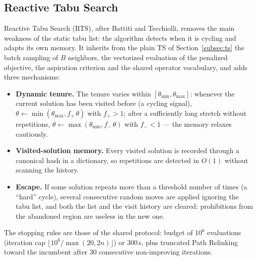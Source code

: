 \subsection{Reactive Tabu Search}
\label{subsec:rts}

Reactive Tabu Search (RTS), after Battiti and Tecchiolli, removes the main
weakness of the static tabu list: the algorithm detects when it is cycling
and adapts its own memory. It inherits from the plain TS of
Section~\ref{subsec:ts} the batch sampling of $B$ neighbors, the vectorized
evaluation of the penalized objective, the aspiration criterion and the
shared operator vocabulary, and adds three mechanisms:

\begin{itemize}
  \item \textbf{Dynamic tenure.} The tenure varies within
    $[\theta_{\min}, \theta_{\max}]$: whenever the current solution has been
    visited before (a cycling signal), $\theta \leftarrow \min(\theta_{\max},
    f_{+}\,\theta)$ with $f_{+} > 1$; after a sufficiently long stretch
    without repetitions, $\theta \leftarrow \max(\theta_{\min},
    f_{-}\,\theta)$ with $f_{-} < 1$ --- the memory relaxes cautiously.
  \item \textbf{Visited-solution memory.} Every visited solution is recorded
    through a canonical hash in a dictionary, so repetitions are detected in
    $O(1)$ without scanning the history.
  \item \textbf{Escape.} If some solution repeats more than a threshold
    number of times (a ``hard'' cycle), several consecutive random moves are
    applied ignoring the tabu list, and both the list and the visit history
    are cleared: prohibitions from the abandoned region are useless in the
    new one.
\end{itemize}

The stopping rules are those of the shared protocol: budget of $10^6$
evaluations (iteration cap $\lfloor 10^6 / \max(20, 2n) \rfloor$) or
300\,s, plus truncated Path Relinking toward the incumbent after 30
consecutive non-improving iterations.

